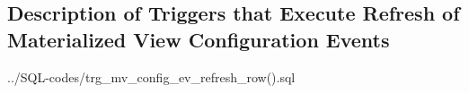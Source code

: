 \subsection{Description of Triggers that Execute Refresh of Materialized View Configuration Events}\label{trg_mv_config_ev_refresh_row}
%
{../SQL-codes/trg_mv_config_ev_refresh_row().sql}

